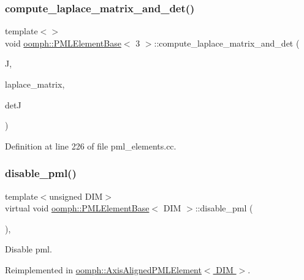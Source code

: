 \subsubsection{\texorpdfstring{compute\+\_\+laplace\+\_\+matrix\+\_\+and\+\_\+det()}{compute\_laplace\_matrix\_and\_det()}\hspace{0.1cm}{\footnotesize\ttfamily [12/12]}}
{\footnotesize\ttfamily template$<$$>$ \\
void \hyperlink{classoomph_1_1PMLElementBase}{oomph\+::\+P\+M\+L\+Element\+Base}$<$ 3 $>$\+::compute\+\_\+laplace\+\_\+matrix\+\_\+and\+\_\+det (\begin{DoxyParamCaption}\item[{const \hyperlink{classoomph_1_1DenseComplexMatrix}{Dense\+Complex\+Matrix} \&}]{J,  }\item[{\hyperlink{classoomph_1_1DenseComplexMatrix}{Dense\+Complex\+Matrix} \&}]{laplace\+\_\+matrix,  }\item[{std\+::complex$<$ double $>$ \&}]{detJ }\end{DoxyParamCaption})}



Definition at line 226 of file pml\+\_\+elements.\+cc.

\mbox{\label{classoomph_1_1PMLElementBase_a751943790221819c111da99455275bbc}} 
\subsubsection{\texorpdfstring{disable\+\_\+pml()}{disable\_pml()}}
{\footnotesize\ttfamily template$<$unsigned D\+IM$>$ \\
virtual void \hyperlink{classoomph_1_1PMLElementBase}{oomph\+::\+P\+M\+L\+Element\+Base}$<$ D\+IM $>$\+::disable\+\_\+pml (\begin{DoxyParamCaption}{ }\end{DoxyParamCaption})\hspace{0.3cm}{\ttfamily [inline]}, {\ttfamily [virtual]}}



Disable pml. 



Reimplemented in \hyperlink{classoomph_1_1AxisAlignedPMLElement_ace457b4782c083fd8b0925ae6b19a3e3}{oomph\+::\+Axis\+Aligned\+P\+M\+L\+Element$<$ D\+I\+M $>$}.



